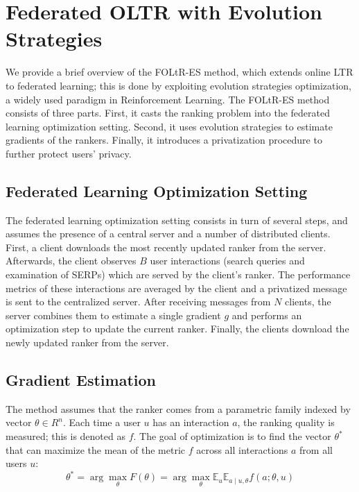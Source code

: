 
\section{Federated OLTR with Evolution Strategies}\label{sec:method}

We provide a brief overview of the FOLtR-ES method, which extends online LTR to federated learning; this is done by exploiting evolution strategies optimization, a widely used paradigm in Reinforcement Learning. 
The FOLtR-ES method consists of three parts. First, it casts the ranking problem into the federated learning optimization setting. Second, it uses evolution strategies to estimate gradients of the rankers. Finally, it introduces a privatization procedure to further protect users' privacy.

\subsection{Federated Learning Optimization Setting}
The federated learning optimization setting consists in turn of several steps, and assumes the presence of a central server and a number of distributed clients. First, a client downloads the most recently updated ranker from the server. Afterwards, the client observes $B$ user interactions (search queries and examination of SERPs) which are served by the client's ranker. The performance metrics of these interactions are averaged by the client and a privatized message is sent to the centralized server. After receiving messages from $N$ clients, the server combines them to estimate a single gradient $g$ and performs an optimization step to update the current ranker. Finally, the clients download the newly updated ranker from the server.

\subsection{Gradient Estimation}
The method assumes that the ranker comes from a parametric family indexed by vector $\theta \in R^{n}$. Each time a user $u$ has an interaction $a$, the ranking quality is measured; this is denoted as $f$. The goal of optimization is to find the vector $\theta^*$ that can maximize the mean of the metric $f$ across all interactions $a$ from all users $u$:
\begin{equation}
	\theta^{*}=\arg \max _{\theta} F(\theta)=\arg \max _{\theta} \mathbb{E}_{u} \mathbb{E}_{a \mid u, \theta} f(a ; \theta, u) \label{eq-theta}
\end{equation}


